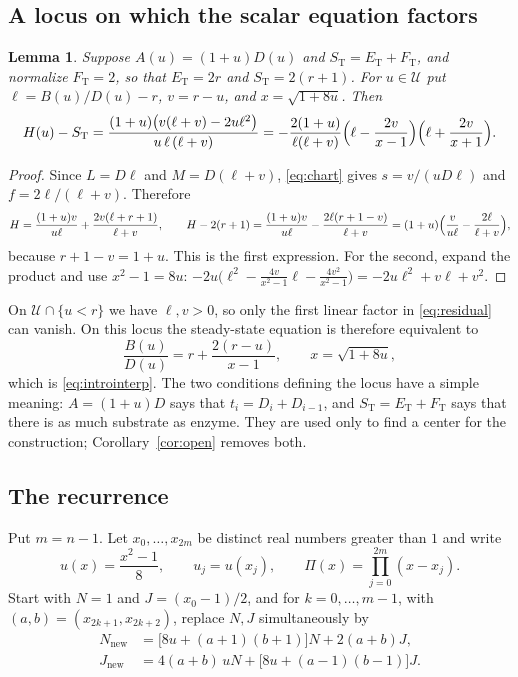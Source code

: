 \documentclass[11pt]{article}
\theoremstyle{plain}
\newtheorem{lemma}[theorem]{Lemma}
\theoremstyle{definition}
\theoremstyle{remark}
\numberwithin{equation}{section}
\newcommand{\ET}{E_{\mathrm T}}
\newcommand{\FT}{F_{\mathrm T}}
\newcommand{\ST}{S_{\mathrm T}}
\begin{document}
\subsection{A locus on which the scalar equation factors}
\begin{lemma}\label{lem:factor}
Suppose \(A(u)=(1+u)D(u)\) and \(\ST=\ET+\FT\), and normalize \(\FT=2\), so that \(\ET=2r\) and
\(\ST=2(r+1)\). For \(u\in\mathcal U\) put \(\ell=B(u)/D(u)-r\), \(v=r-u\), and
\(x=\sqrt{1+8u}\). Then
\begin{equation}\label{eq:residual}
 H(u)-\ST=\frac{(1+u)\bigl(v(\ell+v)-2u\ell^2\bigr)}{u\,\ell\,(\ell+v)}
 =-\frac{2(1+u)}{\ell(\ell+v)}\Bigl(\ell-\frac{2v}{x-1}\Bigr)\Bigl(\ell+\frac{2v}{x+1}\Bigr).
\end{equation}
\end{lemma}
\begin{proof}
Since \(L=D\ell\) and \(M=D(\ell+v)\), \eqref{eq:chart} gives \(s=v/(uD\ell)\) and
\(f=2\ell/(\ell+v)\). Therefore
\[
 H=\frac{(1+u)v}{u\ell}+\frac{2v(\ell+r+1)}{\ell+v},\qquad
 H-2(r+1)=\frac{(1+u)v}{u\ell}-\frac{2\ell(r+1-v)}{\ell+v}
 =(1+u)\Bigl(\frac{v}{u\ell}-\frac{2\ell}{\ell+v}\Bigr),
\]
because \(r+1-v=1+u\). This is the first expression. For the second, expand the product and
use \(x^2-1=8u\):
\(-2u\bigl(\ell^2-\tfrac{4v}{x^2-1}\ell-\tfrac{4v^2}{x^2-1}\bigr)=-2u\ell^2+v\ell+v^2\).
\end{proof}

On \(\mathcal U\cap\{u<r\}\) we have \(\ell,v>0\), so only the first linear factor in
\eqref{eq:residual} can vanish. On this locus the steady-state equation is therefore
equivalent to
\begin{equation}\label{eq:interp}
 \frac{B(u)}{D(u)}=r+\frac{2(r-u)}{x-1},\qquad x=\sqrt{1+8u},
\end{equation}
which is \eqref{eq:introinterp}. The two conditions defining the locus have a simple meaning:
\(A=(1+u)D\) says that \(t_i=D_i+D_{i-1}\), and \(\ST=\ET+\FT\) says that there is as much
substrate as enzyme. They are used only to find a center for the construction;
Corollary~\ref{cor:open} removes both.

\subsection{The recurrence}
Put \(m=n-1\). Let \(x_0,\dots,x_{2m}\) be distinct real numbers greater than \(1\) and write
\begin{equation}\label{eq:ux}
 u(x)=\frac{x^2-1}{8},\qquad u_j=u(x_j),\qquad \Pi(x)=\prod_{j=0}^{2m}(x-x_j).
\end{equation}
Start with \(N=1\) and \(J=(x_0-1)/2\), and for \(k=0,\dots,m-1\), with
\((a,b)=(x_{2k+1},x_{2k+2})\), replace \(N,J\) simultaneously by
\begin{equation}\label{eq:recurrence}
\begin{aligned}
 N_{\mathrm{new}}&=\bigl[8u+(a+1)(b+1)\bigr]N+2(a+b)J,\\
 J_{\mathrm{new}}&=4(a+b)\,uN+\bigl[8u+(a-1)(b-1)\bigr]J .
\end{aligned}
\end{equation}
\end{document}

